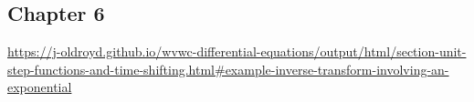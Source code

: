 \documentclass{article}
\begin{document}
  \subsection{Chapter 6}
    \href{Example 6.3.3: Inverse transform involving an exponential}{https://j-oldroyd.github.io/wvwc-differential-equations/output/html/section-unit-step-functions-and-time-shifting.html\#example-inverse-transform-involving-an-exponential}
    \begin{center}
    \end{center}
\end{document}
